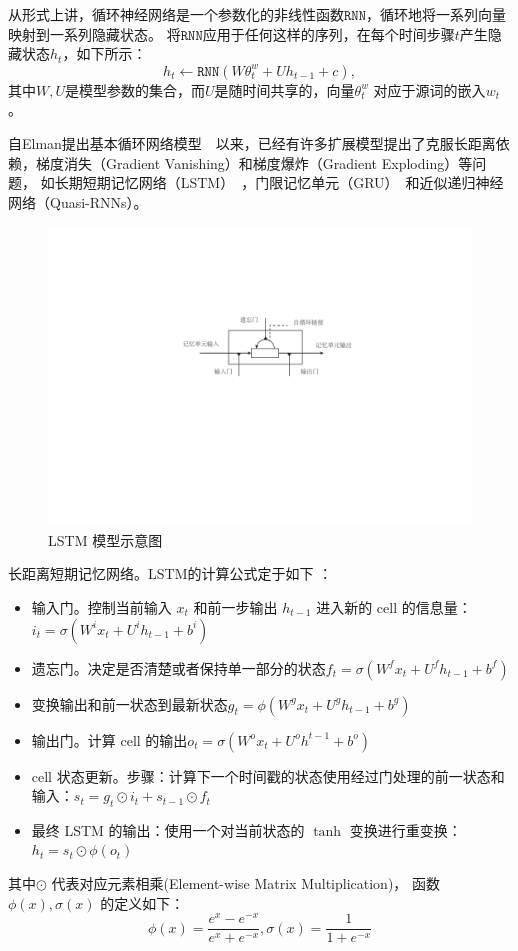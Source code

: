 从形式上讲，循环神经网络是一个参数化的非线性函数$ \mathtt{RNN} $，循环地将一系列向量映射到一系列隐藏状态。 将$ \mathtt{RNN} $应用于任何这样的序列，在每个时间步骤$ t $产生隐藏状态$ h_t $，如下所示：
\begin{equation}
  h_t \leftarrow  \mathtt{RNN}(W\theta^w_t + U h_{t-1} +c),
\end{equation}
其中$ W,U $是模型参数的集合，而$ U $是随时间共享的，向量$ \theta^w_t$ 对应于源词的嵌入$ w_t $。

自Elman提出基本循环网络模型~~以来，已经有许多扩展模型提出了克服长距离依赖，梯度消失（Gradient Vanishing）和梯度爆炸（Gradient Exploding）等问题， 如长期短期记忆网络（LSTM）~，门限记忆单元（GRU）~和近似递归神经网络（Quasi-RNNs）。

\begin{figure}[!ht]
  \centering
  \includegraphics[width=0.7\linewidth]{./figures/lstm.pdf}
  \caption{LSTM 模型示意图}\label{fig:lstm}
\end{figure}

{长距离短期记忆网络}。LSTM的计算公式定于如下 ：
\begin{itemize}
\item 输入门。控制当前输入 $x_t$ 和前一步输出 $h_{t−1}$ 进入新的 cell 的信息量：$i_t=\sigma(W^i x_t+U^i h_{t-1}+b^i)$
\item  遗忘门。决定是否清楚或者保持单一部分的状态$f_t=\sigma(W^f x_t+U^f h_{t-1}+b^f)$
\item  变换输出和前一状态到最新状态$g_t=\phi(W^g x_t+U^g h_{t-1}+b^g)$
\item  输出门。计算 cell 的输出$o_t=\sigma(W^o x_t+U^o h^{t-1}+b^o)$
\item  cell 状态更新。步骤：计算下一个时间戳的状态使用经过门处理的前一状态和输入：$s_t=g_t\odot i_t+s_{t-1}\odot f_t$
\item 最终 LSTM 的输出：使用一个对当前状态的 $\tanh$ 变换进行重变换：$h_t=s_t\odot \phi(o_t)$
\end{itemize}
\noindent 其中$\odot$ 代表对应元素相乘(Element-wise Matrix Multiplication)， 函数 $\phi(x), \sigma(x)$ 的定义如下：
\begin{equation}\label{equ:tanh}
  \phi(x)=\frac{e^x-e^{-x}}{e^x+e^{-x}},\sigma(x)=\frac{1}{1+e^{-x}}
\end{equation}

